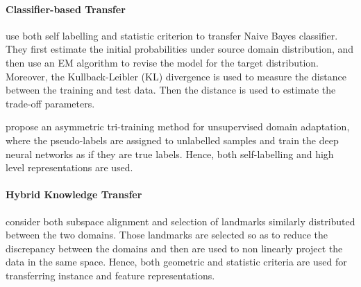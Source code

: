 \documentclass[prodmode]{acmsmall}  %
\begin{document}
\paragraph{Classifier-based Transfer}
 use both self labelling and statistic criterion to transfer Naive Bayes classifier. They first estimate the initial probabilities under source domain distribution, and then use an EM algorithm to revise the model for the target distribution. Moreover, the Kullback-Leibler (KL) divergence is used to measure the distance between the training and test data. Then the distance is used to estimate the trade-off parameters. 

 propose an asymmetric tri-training method for unsupervised domain adaptation, where the pseudo-labels are assigned to unlabelled samples and train the deep neural networks as if they are true labels. Hence, both self-labelling and high level representations are used.
\paragraph{Hybrid Knowledge Transfer}
 consider both subspace alignment and selection of landmarks similarly distributed between the two domains. Those landmarks are selected so as to reduce the discrepancy between the domains and then are used to non linearly project the data in the same space. Hence, both geometric and statistic criteria are used for transferring instance and feature representations.
\end{document}
